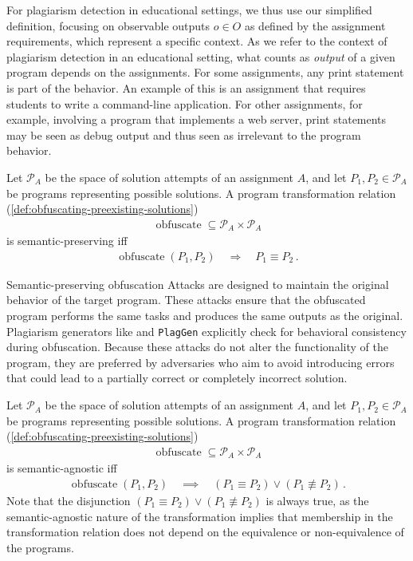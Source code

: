 For plagiarism detection in educational settings, we thus use our simplified definition, focusing on observable outputs \(o \in O\) as defined by the assignment requirements, which represent a specific context.
As we refer to the context of plagiarism detection in an educational setting, what counts as \textit{output} of a given program depends on the assignments. For some assignments, any print statement is part of the behavior. An example of this is an assignment that requires students to write a command-line application. For other assignments, for example, involving a program that implements a web server, print statements may be seen as debug output and thus seen as irrelevant to the program behavior.


\begin{theorem}\label{def:spoa}
Let  \(\mathcal{P}_A\) be the space of solution attempts of an assignment \(A\), and let \(P_1, P_2 \in \mathcal{P}_A\) be programs representing possible solutions. A program transformation relation (\autoref{def:obfuscating-preexisting-solutions})
\begin{align*}
    \operatorname{obfuscate} \subseteq \mathcal{P}_A \times \mathcal{P}_A
\end{align*}
is semantic-preserving iff
\begin{align*}
    \operatorname{obfuscate}(P_1, P_2) \quad \Rightarrow \quad P_1 \equiv P_2 \,.
\end{align*}
\end{theorem}

Semantic-preserving obfuscation Attacks are designed to maintain the original behavior of the target program. These attacks ensure that the obfuscated program performs the same tasks and produces the same outputs as the original. Plagiarism generators like \mossad and \texttt{PlagGen} explicitly check for behavioral consistency during obfuscation. Because these attacks do not alter the functionality of the program, they are preferred by adversaries who aim to avoid introducing errors that could lead to a partially correct or completely incorrect solution.

\begin{theorem}\label{def:saoa}
Let \(\mathcal{P}_A\) be the space of solution attempts of an assignment \(A\), and let \(P_1, P_2 \in \mathcal{P}_A\) be programs representing possible solutions. A program transformation relation (\autoref{def:obfuscating-preexisting-solutions})
\begin{align*}
    \operatorname{obfuscate} \subseteq \mathcal{P}_A \times \mathcal{P}_A
\end{align*}
is semantic-agnostic iff
\begin{align*}
    \operatorname{obfuscate}(P_1, P_2) \quad \implies \quad (P_1 \equiv P_2) \lor (P_1 \not\equiv P_2) \,.
\end{align*}
Note that the disjunction \((P_1 \equiv P_2) \lor (P_1 \not\equiv P_2)\) is always true, as the semantic-agnostic nature of the transformation implies that membership in the transformation relation does not depend on the equivalence or non-equivalence of the programs.
\end{theorem}

